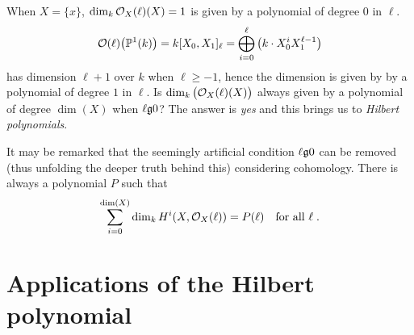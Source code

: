 \documentclass[a4paper,parskip=half,numbers=enddot, DIV=12]{scrreprt}
\begin{document}
\begin{rem*}
    When $X=\{x\}$, $\dim_k \mathcal{O}_X(\ell)(X) = 1$ is given by a polynomial of degree $0$ in $\ell$. 
    \begin{align*}
        \mathcal{O}(\ell)\big(\mathbb{P}^1(k)\big) = k[X_0,X_1]_\ell=\bigoplus_{i=0}^\ell \left(k\cdot X_0^iX_1^{\ell-1}\right)
    \end{align*}
    has dimension $\ell+1$ over $k$ when $\ell\geq -1$, hence the dimension is given by by a polynomial of degree $1$ in $\ell$. Is $\dim_k\big(\mathcal{O}_X(\ell)(X)\big)$ always given by a polynomial of degree $\dim(X)$ when $\ell \gge 0$? The answer is \emph{yes} and this brings us to \emph{Hilbert polynomials}.
    
    It may be remarked that the seemingly artificial condition $\ell\gge0$ can be removed (thus unfolding the deeper truth behind this) considering cohomology. There is always a polynomial $P$ such that 
    \begin{align*}
	    \sum_{i=0}^{\dim (X)} \dim_kH^i(X,\mathcal{O}_X(\ell)) = P(\ell)\quad\text{for all }\ell\;.
    \end{align*}
\end{rem*}



\chapter{Applications of the Hilbert polynomial}
\end{document}
